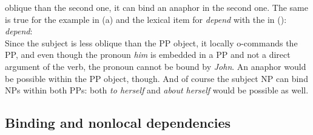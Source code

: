 \documentclass[output=paper,biblatex,babelshorthands,newtxmath,draftmode,colorlinks,citecolor=brown]{langscibook}
\begin{document}
oblique than the second one, it can bind an anaphor in the second one. The same is true for the
example in (a) and the lexical item for \emph{depend} with the \argst in ():
\ea
\emph{depend}:\\
\argst {}
\z
Since the subject is less oblique than the PP object, it locally o-commands
the PP, and even though the pronoun \emph{him} is embedded in a PP and not a direct argument of the verb,
the pronoun cannot be bound by \emph{John}. An anaphor would be possible within the PP object, though.
And of course the subject NP can bind NPs within both PPs: both \emph{to herself} and \emph{about
  herself} would be possible as well.\label{binding:page-prepositional-objects-end}


\subsection{Binding and nonlocal dependencies}




\end{document}
